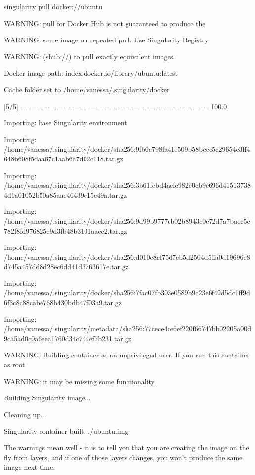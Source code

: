 \documentclass[letterpaper,10pt,english]{sphinxmanual}
\begin{document}
%
\begin{sphinxVerbatim}[commandchars=\\\{\}]
singularity pull docker://ubuntu

WARNING: pull for Docker Hub is not guaranteed to produce the

WARNING: same image on repeated pull. Use Singularity Registry

WARNING: (shub://) to pull exactly equivalent images.

Docker image path: index.docker.io/library/ubuntu:latest

Cache folder set to /home/vanessa/.singularity/docker

[5/5] \textbar{}===================================\textbar{} 100.0\PYGZpc{}

Importing: base Singularity environment

Importing: /home/vanessa/.singularity/docker/sha256:9fb6c798fa41e509b58bccc5c29654c3ff4648b608f5daa67c1aab6a7d02c118.tar.gz

Importing: /home/vanessa/.singularity/docker/sha256:3b61febd4aefe982e0cb9c696d415137384d1a01052b50a85aae46439e15e49a.tar.gz

Importing: /home/vanessa/.singularity/docker/sha256:9d99b9777eb02b8943c0e72d7a7baec5c782f8fd976825c9d3fb48b3101aacc2.tar.gz

Importing: /home/vanessa/.singularity/docker/sha256:d010c8cf75d7eb5d2504d5ffa0d19696e8d745a457dd8d28ec6dd41d3763617e.tar.gz

Importing: /home/vanessa/.singularity/docker/sha256:7fac07fb303e0589b9c23e6f49d5dc1ff9d6f3c8c88cabe768b430bdb47f03a9.tar.gz

Importing: /home/vanessa/.singularity/metadata/sha256:77cece4ce6ef220f66747bb02205a00d9ca5ad0c0a6eea1760d34c744ef7b231.tar.gz

WARNING: Building container as an unprivileged user. If you run this container as root

WARNING: it may be missing some functionality.

Building Singularity image...

Cleaning up...

Singularity container built: ./ubuntu.img
\end{sphinxVerbatim}

The warnings mean well - it is to tell you that you are creating the
image on the fly from layers, and if one of those layers changes, you
won’t produce the same image next time.
\end{document}
